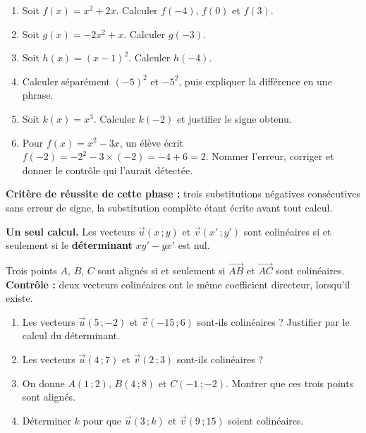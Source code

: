 \documentclass[10pt,a4paper]{article}
\begin{document}
\begin{enumerate}
\needspace{18mm}
\item Soit $f(x) = x^2 + 2x$. Calculer $f(-4)$, $f(0)$ et $f(3)$.
\needspace{18mm}
\item Soit $g(x) = -2x^2 + x$. Calculer $g(-3)$.
\needspace{18mm}
\item Soit $h(x) = (x - 1)^2$. Calculer $h(-4)$.
\needspace{18mm}
\item Calculer séparément $(-5)^2$ et $-5^2$, puis expliquer la différence en une phrase.
\needspace{18mm}
\item Soit $k(x) = x^3$. Calculer $k(-2)$ et justifier le signe obtenu.
\needspace{18mm}
\item Pour $f(x) = x^2 - 3x$, un élève écrit $f(-2) = -2^2 - 3\times(-2) = -4 + 6 = 2$. Nommer l'erreur, corriger et donner le contrôle qui l'aurait détectée.
\end{enumerate}
\begin{successbox}\textbf{Critère de réussite de cette phase :} trois substitutions négatives consécutives sans erreur de signe, la substitution complète étant écrite avant tout calcul.\end{successbox}
\certline
\needspace{62mm}\par\vspace{3mm}
\begin{methodbox}
\textbf{Un seul calcul.} Les vecteurs $\vec{u}(x\,;y)$ et $\vec{v}(x'\,;y')$ sont colinéaires si et seulement si
le \textbf{déterminant} $xy' - yx'$ est nul.
\par\smallskip
Trois points $A$, $B$, $C$ sont alignés si et seulement si $\vec{AB}$ et $\vec{AC}$ sont colinéaires.
\textbf{Contrôle :} deux vecteurs colinéaires ont le même coefficient directeur, lorsqu'il existe.
\end{methodbox}
\begin{enumerate}
\needspace{18mm}
\item Les vecteurs $\vec{u}(5\,;-2)$ et $\vec{v}(-15\,;6)$ sont-ils colinéaires ? Justifier par le calcul du déterminant.
\needspace{18mm}
\item Les vecteurs $\vec{u}(4\,;7)$ et $\vec{v}(2\,;3)$ sont-ils colinéaires ?
\needspace{18mm}
\item On donne $A(1\,;2)$, $B(4\,;8)$ et $C(-1\,;-2)$. Montrer que ces trois points sont alignés.
\needspace{18mm}
\item Déterminer $k$ pour que $\vec{u}(3\,;k)$ et $\vec{v}(9\,;15)$ soient colinéaires.
\end{enumerate}
\end{document}
